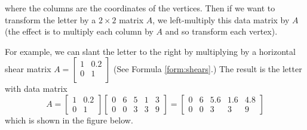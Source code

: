 \documentclass{ximera}
\begin{document}
where the columns are the coordinates of the vertices. Then if we want to transform the letter by a $2 \times 2$ matrix $A$, we left-multiply this data matrix by $A$ (the effect is to multiply each column by $A$ and so transform each vertex).

For example, we can slant the letter to the right by multiplying by a horizontal shear matrix $A = \left[
\begin{array}{ll}
1 & 0.2\\
0 & 1\\
\end{array}
\right]$
 (See Formula \ref{form:shears}.) The result is the letter with data matrix
\begin{equation*}
A = \left[
\begin{array}{ll}
1 & 0.2\\
0 & 1
\end{array}
\right] \left[
\begin{array}{rrrrr}
0 & 6 & 5 & 1 & 3\\
0 & 0 & 3 & 3 & 9
\end{array}
\right] =
 \left[
\begin{array}{lllll}
0 & 6 & 5.6 & 1.6 & 4.8\\
0 & 0 & 3 & 3 & 9
\end{array}
\right]
\end{equation*}
which is shown in the figure below.

 \begin{center}
\end{center}  
\end{document}
